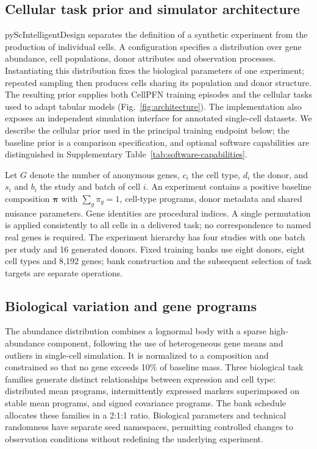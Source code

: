 \subsection*{Cellular task prior and simulator architecture}
\label{sec:simulator}

pyScIntelligentDesign separates the definition of a synthetic experiment from the production of individual cells. A configuration specifies a distribution over gene abundance, cell populations, donor attributes and observation processes. Instantiating this distribution fixes the biological parameters of one experiment; repeated sampling then produces cells sharing its population and donor structure. The resulting prior supplies both CellPFN training episodes and the cellular tasks used to adapt tabular models (Fig.~\ref{fig:architecture}). The implementation also exposes an independent simulation interface for annotated single-cell datasets. We describe the cellular prior used in the principal training endpoint below; the baseline prior is a comparison specification, and optional software capabilities are distinguished in Supplementary Table~\ref{tab:software-capabilities}.

Let $G$ denote the number of anonymous genes, $c_i$ the cell type, $d_i$ the donor, and $s_i$ and $b_i$ the study and batch of cell $i$. An experiment contains a positive baseline composition $\boldsymbol\pi$ with $\sum_g\pi_g=1$, cell-type programs, donor metadata and shared nuisance parameters. Gene identities are procedural indices. A single permutation is applied consistently to all cells in a delivered task; no correspondence to named real genes is required. The experiment hierarchy has four studies with one batch per study and 16 generated donors. Fixed training banks use eight donors, eight cell types and 8,192 genes; bank construction and the subsequent selection of task targets are separate operations.

\subsection*{Biological variation and gene programs}
\label{sec:simulator-biology}

The abundance distribution combines a lognormal body with a sparse high-abundance component, following the use of heterogeneous gene means and outliers in single-cell simulation\cite{zappia2017splatter}. It is normalized to a composition and constrained so that no gene exceeds 10\% of baseline mass. Three biological task families generate distinct relationships between expression and cell type: distributed mean programs, intermittently expressed markers superimposed on stable mean programs, and signed covariance programs. The bank schedule allocates these families in a 2:1:1 ratio. Biological parameters and technical randomness have separate seed namespaces, permitting controlled changes to observation conditions without redefining the underlying experiment.

